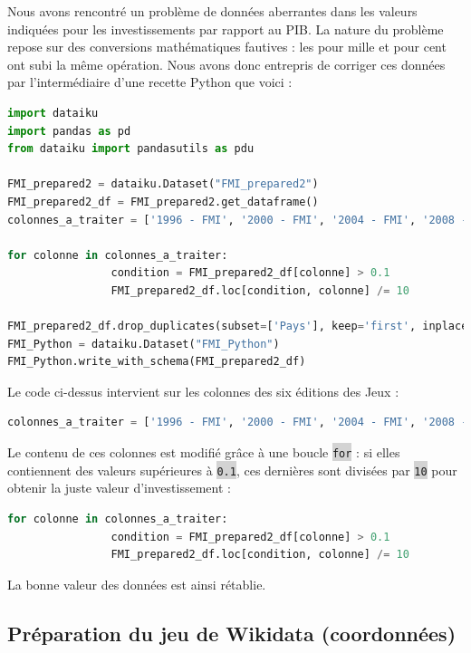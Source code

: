 \documentclass[hidelinks, 12pt]{report}
\newcommand{\code}[1]{\colorbox{LightGray}{\texttt{#1}}}
\begin{document}
Nous avons rencontré un problème de données aberrantes dans les valeurs indiquées pour les investissements par rapport au PIB. La nature du problème repose sur des conversions mathématiques fautives : les pour mille et pour cent ont subi la même opération. Nous avons donc entrepris de corriger ces données par l'intermédiaire d'une recette Python que voici :

\label{python}\begin{lstlisting}[language=python]
import dataiku
import pandas as pd
from dataiku import pandasutils as pdu

FMI_prepared2 = dataiku.Dataset("FMI_prepared2")
FMI_prepared2_df = FMI_prepared2.get_dataframe()
colonnes_a_traiter = ['1996 - FMI', '2000 - FMI', '2004 - FMI', '2008 - FMI', '2012 - FMI', '2016 - FMI']

for colonne in colonnes_a_traiter:
				condition = FMI_prepared2_df[colonne] > 0.1
				FMI_prepared2_df.loc[condition, colonne] /= 10

FMI_prepared2_df.drop_duplicates(subset=['Pays'], keep='first', inplace=True)
FMI_Python = dataiku.Dataset("FMI_Python")
FMI_Python.write_with_schema(FMI_prepared2_df)
\end{lstlisting}

Le code ci-dessus intervient sur les colonnes des six éditions des Jeux :

\begin{lstlisting}[language=python]	
colonnes_a_traiter = ['1996 - FMI', '2000 - FMI', '2004 - FMI', '2008 - FMI', '2012 - FMI', '2016 - FMI']
\end{lstlisting}

Le contenu de ces colonnes est modifié grâce à une boucle \code{for} : si elles contiennent des valeurs supérieures à \code{0.1}, ces dernières sont divisées par \code{10} pour obtenir la juste valeur d'investissement :

\begin{lstlisting}[language=python]
for colonne in colonnes_a_traiter:
				condition = FMI_prepared2_df[colonne] > 0.1
				FMI_prepared2_df.loc[condition, colonne] /= 10
\end{lstlisting}

La bonne valeur des données est ainsi rétablie.





%





\subsection{Préparation du jeu de Wikidata (coordonnées)}
\end{document}
